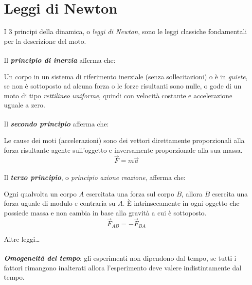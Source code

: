 \section{Leggi di Newton}
I $3$ principi della dinamica, o \textit{leggi di Newton}, sono le leggi classiche fondamentali per la descrizione del moto.

\paragraph{}
Il \textbf{\textit{principio di inerzia}} afferma che:

Un corpo in un sistema di riferimento inerziale (senza sollecitazioni) o è in \textit{quiete}, se non è sottoposto ad alcuna forza o le forze risultanti sono nulle, o gode di un moto di tipo \textit{rettilineo uniforme}, quindi con velocità costante e accelerazione uguale a zero.

\paragraph{}
Il \textbf{\textit{secondo principio}} afferma che:

Le cause dei moti (accelerazioni) sono dei vettori direttamente proporzionali alla forza risultante agente sull'oggetto e inversamente proporzionale alla sua massa.
\begin{equation}
    \vec{F} = m\vec{a}
    \label{secondaLeggeNewton}
\end{equation}

\paragraph{}
Il \textbf{\textit{terzo principio}}, o \textit{principio azione reazione}, afferma che:

Ogni qualvolta un corpo $A$ esercitata una forza sul corpo $B$, allora $B$ esercita una forza uguale di modulo e contraria su $A$. È intrinsecamente in ogni oggetto che possiede massa e non cambia in base alla gravità a cui è sottoposto.
\begin{equation}
    \vec{F}_{AB} = -\vec{F}_{BA}
    \label{terzaLeggeNewton}
\end{equation}

Altre leggi\dots
\paragraph{}

\textbf{\textit{Omogeneità del tempo}}: gli esperimenti non dipendono dal tempo, se tutti i fattori rimangono inalterati allora l’esperimento deve valere indistintamente dal tempo.


